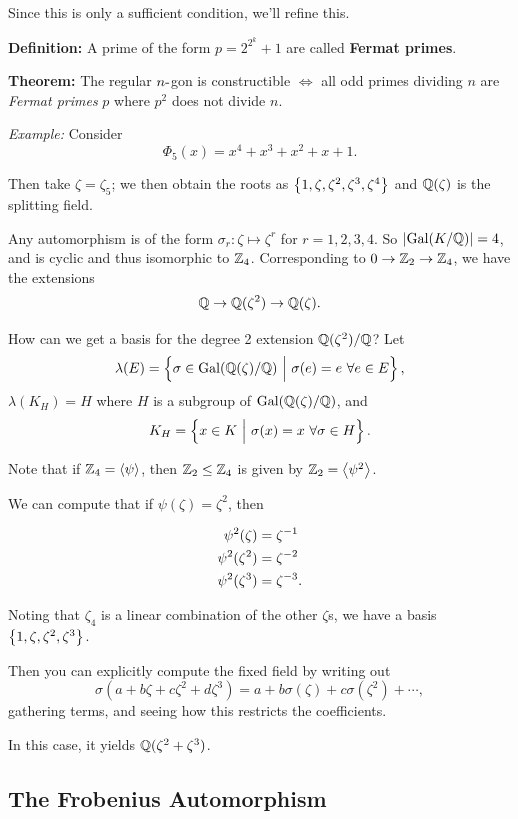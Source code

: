Since this is only a sufficient condition, we'll refine this.

\textbf{Definition:} A prime of the form \(p = 2^{2^k}+1\) are called
\textbf{Fermat primes}.

\textbf{Theorem:} The regular \(n{\hbox{-}}\)gon is constructible \(\iff\)
all odd primes dividing \(n\) are \emph{Fermat primes} \(p\) where
\(p^2\) does not divide \(n\).

\emph{Example:} Consider \[
\Phi_5(x) = x^4 + x^3 + x^2 + x + 1
.\]

Then take \(\zeta = \zeta_5\); we then obtain the roots as
\(\left\{{1, \zeta, \zeta^2, \zeta^3, \zeta^4}\right\}\) and \({\mathbb{Q}}(\zeta)\) is
the splitting field.

Any automorphism is of the form \(\sigma_r: \zeta \mapsto \zeta^r\) for
\(r=1,2,3,4\). So \({\left\lvert {\mathrm{Gal}(K/{\mathbb{Q}})} \right\rvert} = 4\), and is cyclic and thus
isomorphic to \({\mathbb{Z}}_4\). Corresponding to \(0 \to {\mathbb{Z}}_2 \to {\mathbb{Z}}_4\), we
have the extensions \[
{\mathbb{Q}} \to {\mathbb{Q}}(\zeta^2) \to {\mathbb{Q}}(\zeta)
.\]

How can we get a basis for the degree 2 extension \({\mathbb{Q}}(\zeta^2)/{\mathbb{Q}}\)?
Let \[
\lambda(E) = \left\{{\sigma \in \mathrm{Gal}({\mathbb{Q}}(\zeta)/{\mathbb{Q}}) {~\mathrel{\Big|}~} \sigma(e) = e ~\forall e\in E }\right\}
,\] \(\lambda(K_H) = H\) where \(H\) is a subgroup of
\(\mathrm{Gal}({\mathbb{Q}}(\zeta)/{\mathbb{Q}})\), and \[
K_H = \left\{{x\in K {~\mathrel{\Big|}~} \sigma(x) = x ~\forall \sigma\in H}\right\}
.\]

Note that if \({\mathbb{Z}}_4 = \left\langle{\psi}\right\rangle\), then \({\mathbb{Z}}_2 \leq {\mathbb{Z}}_4\) is
given by \({\mathbb{Z}}_2 = \left\langle{\psi^2}\right\rangle\).

We can compute that if \(\psi(\zeta) = \zeta^2\), then

\begin{align*}
\psi^2(\zeta) &= \zeta^{-1} \\
\psi^2(\zeta^2) &= \zeta^{-2}\\
\psi^2(\zeta^3) &= \zeta^{-3}
.\end{align*}

Noting that \(\zeta_4\) is a linear combination of the other \(\zeta\)s,
we have a basis \(\left\{{1, \zeta, \zeta^2, \zeta^3}\right\}\).

Then you can explicitly compute the fixed field by writing out \[
\sigma(a + b\zeta + c\zeta^2 + d\zeta^3) = a + b\sigma(\zeta) + c\sigma(\zeta^2) + \cdots
,\] gathering terms, and seeing how this restricts the coefficients.

In this case, it yields \({\mathbb{Q}}(\zeta^2 + \zeta^3)\).

\hypertarget{the-frobenius-automorphism}{%
\subsection{The Frobenius
Automorphism}\label{the-frobenius-automorphism}}

